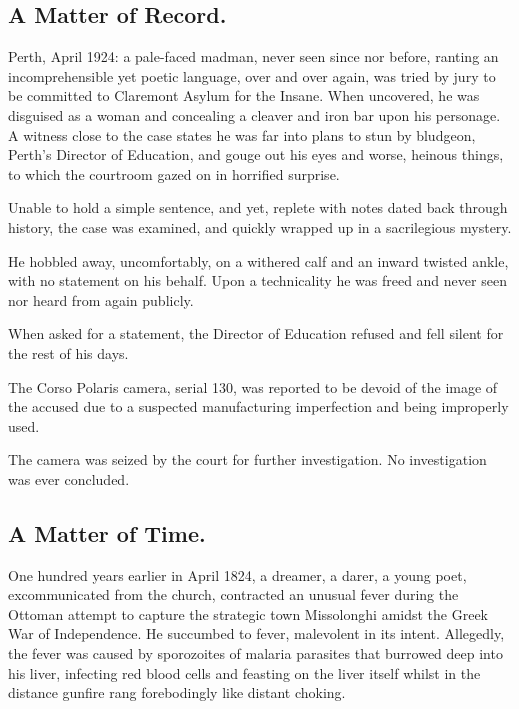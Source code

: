 

\prelude

\subsection*{A Matter of Record.}

Perth, April 1924: a pale-faced madman, never seen since nor before,
ranting an incomprehensible yet poetic language, over and over again,
was tried by jury to be committed to Claremont Asylum for the
Insane. When uncovered, he was disguised as a woman and concealing a cleaver and
iron bar upon his personage.
A witness close to the case states he was
far into plans to stun by bludgeon, Perth’s Director of Education, and
gouge out his eyes and worse, heinous things, to which the courtroom
gazed on in horrified surprise.

Unable to hold a simple sentence, and yet, replete with notes dated
back through history, the case was examined, and quickly wrapped up in
a sacrilegious mystery.

He hobbled away, uncomfortably, on a withered calf and an inward
twisted ankle, with no statement on his behalf. Upon a technicality he was
freed and never seen nor heard from again publicly.

When asked for a statement, the Director of Education refused and fell
silent for the rest of his days.

The Corso Polaris camera, serial 130, was reported to be devoid of the
image of the accused due to a suspected manufacturing imperfection and
being improperly used.

The camera was seized by the court for further investigation. No
investigation was ever concluded.

\fugue

\subsection*{A Matter of Time.}

One hundred years earlier in April 1824, a dreamer, a darer, a young
poet, excommunicated from the church, contracted an unusual fever
during the Ottoman attempt to capture the strategic town Missolonghi
amidst the Greek War of Independence. He succumbed to fever,
malevolent in its intent. Allegedly, the fever was caused by
sporozoites of malaria parasites that burrowed deep into his liver,
infecting red blood cells and feasting on the liver itself whilst in
the distance gunfire rang forebodingly like distant choking.

